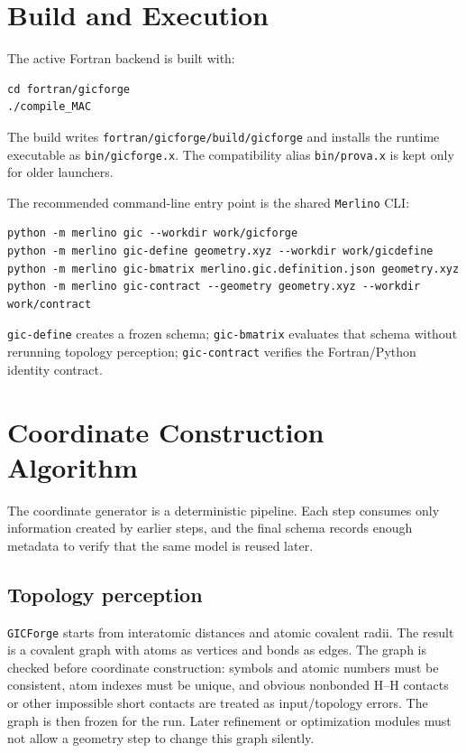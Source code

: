 \documentclass[11pt]{article}
\newcommand{\program}{\texttt{GICForge}}
\newcommand{\merlino}{\texttt{Merlino}}
\begin{document}
\section{Build and Execution}

The active Fortran backend is built with:

\begin{lstlisting}[style=merlino]
cd fortran/gicforge
./compile_MAC
\end{lstlisting}

\noindent
The build writes \texttt{fortran/gicforge/build/gicforge} and installs the
runtime executable as \texttt{bin/gicforge.x}.  The compatibility alias
\texttt{bin/prova.x} is kept only for older launchers.

The recommended command-line entry point is the shared \merlino{} CLI:

\begin{lstlisting}[style=merlino]
python -m merlino gic --workdir work/gicforge
python -m merlino gic-define geometry.xyz --workdir work/gicdefine
python -m merlino gic-bmatrix merlino.gic.definition.json geometry.xyz
python -m merlino gic-contract --geometry geometry.xyz --workdir work/contract
\end{lstlisting}

\noindent
\texttt{gic-define} creates a frozen schema; \texttt{gic-bmatrix} evaluates that
schema without rerunning topology perception; \texttt{gic-contract} verifies the
Fortran/Python identity contract.

\section{Coordinate Construction Algorithm}

The coordinate generator is a deterministic pipeline.  Each step consumes only
information created by earlier steps, and the final schema records enough
metadata to verify that the same model is reused later.

\subsection{Topology perception}

\program{} starts from interatomic distances and atomic covalent radii.  The
result is a covalent graph with atoms as vertices and bonds as edges.  The graph
is checked before coordinate construction: symbols and atomic numbers must be
consistent, atom indexes must be unique, and obvious nonbonded H--H contacts or
other impossible short contacts are treated as input/topology errors.  The graph
is then frozen for the run.  Later refinement or optimization modules must not
allow a geometry step to change this graph silently.
\end{document}

